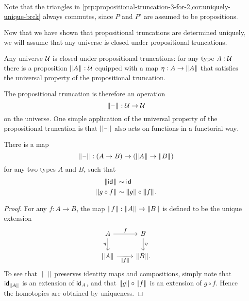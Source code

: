 \begin{rmk}
  Note that the triangles in \cref{prp:propositional-truncation-3-for-2,cor:uniquely-unique-brck} always commutes, since $P$ and $P'$ are assumed to be propositions.
\end{rmk}

Now that we have shown that propositional truncations are determined uniquely, we will assume that any universe is closed under propositional truncations.

\begin{axiom}
  Any universe $\UU$ is closed under propositional truncations: for any type $A:\UU$ there is a proposition $\brck{A}:\UU$ equipped with a map $\eta:A\to\brck{A}$ that satisfies the universal property of the propositional truncation.
\end{axiom}

The propositional truncation is therefore an operation
\begin{equation*}
  \brck{\blank}:\UU\to\UU
\end{equation*}
on the universe. One simple application of the universal property of the propositional truncation is that $\brck{\blank}$ also acts on functions in a functorial way.

\begin{prp}
  There is a map
  \begin{equation*}
    \brck{\blank}:(A\to B)\to (\brck{A}\to\brck{B})
  \end{equation*}
  for any two types $A$ and $B$, such that
  \begin{align*}
    \brck{\idfunc} & \htpy \idfunc \\
    \brck{g\circ f} & \htpy \brck{g}\circ\brck{f}.
  \end{align*}
\end{prp}

\begin{proof}
  For any $f:A\to B$, the map $\brck{f}:\brck{A}\to\brck{B}$ is defined to be the unique extension
  \begin{equation*}
    \begin{tikzcd}
      A \arrow[d,swap,"\eta"] \arrow[r,"f"] & B \arrow[d,"\eta"] \\
      \brck{A} \arrow[r,densely dotted,swap,"\brck{f}"] & \brck{B}.
    \end{tikzcd}
  \end{equation*}
  To see that $\brck{\blank}$ preserves identity maps and compositions, simply note that $\idfunc[\brck{A}]$ is an extension of $\idfunc[A]$, and that $\brck{g}\circ\brck{f}$ is an extension of $g\circ f$. Hence the homotopies are obtained by uniqueness.
\end{proof}

